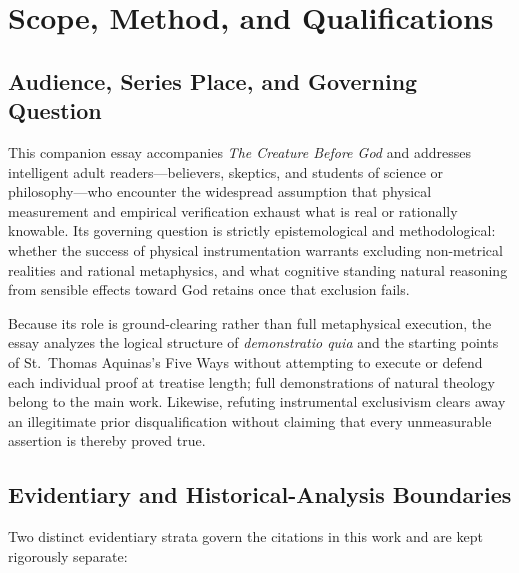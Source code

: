 \section{Scope, Method, and Qualifications}\label{sec:scope-method}

\subsection*{Audience, Series Place, and Governing Question}

This companion essay accompanies \emph{The Creature Before God} and addresses intelligent adult readers---believers, skeptics, and students of science or philosophy---who encounter the widespread assumption that physical measurement and empirical verification exhaust what is real or rationally knowable. Its governing question is strictly epistemological and methodological: whether the success of physical instrumentation warrants excluding non-metrical realities and rational metaphysics, and what cognitive standing natural reasoning from sensible effects toward God retains once that exclusion fails.

Because its role is ground-clearing rather than full metaphysical execution, the essay analyzes the logical structure of \emph{demonstratio quia} and the starting points of St.\ Thomas Aquinas's Five Ways without attempting to execute or defend each individual proof at treatise length; full demonstrations of natural theology belong to the main work. Likewise, refuting instrumental exclusivism clears away an illegitimate prior disqualification without claiming that every unmeasurable assertion is thereby proved true.

\subsection*{Evidentiary and Historical-Analysis Boundaries}

Two distinct evidentiary strata govern the citations in this work and are kept rigorously separate:

